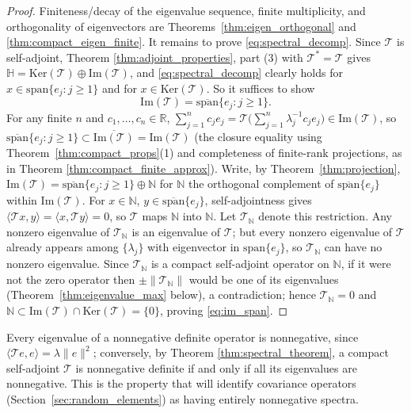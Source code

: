 \begin{proof}
Finiteness/decay of the eigenvalue sequence, finite multiplicity, and
orthogonality of eigenvectors are Theorems~\ref{thm:eigen_orthogonal} and
\ref{thm:compact_eigen_finite}. It remains to prove
\eqref{eq:spectral_decomp}. Since $\mathcal{T}$ is self-adjoint, Theorem
\ref{thm:adjoint_properties}, part (3) with $\mathcal{T}^*=\mathcal{T}$
gives $\mathbb{H} = \mathrm{Ker}(\mathcal{T})\oplus\mathrm{Im}(\mathcal{T})$,
and \eqref{eq:spectral_decomp} clearly holds for
$x\in\mathrm{span}\{e_j:j\geq 1\}$ and for $x\in\mathrm{Ker}(\mathcal{T})$.
So it suffices to show
\begin{equation}
\mathrm{Im}(\mathcal{T}) = \overline{\mathrm{span}}\{e_j:j\geq 1\}.
\label{eq:im_span}
\end{equation}
For any finite $n$ and $c_1,\dots,c_n\in\mathbb{R}$,
$\sum_{j=1}^n c_je_j = \mathcal{T}\big(\sum_{j=1}^n\lambda_j^{-1}c_je_j
\big)\in\mathrm{Im}(\mathcal{T})$, so $\overline{\mathrm{span}}\{e_j:j\geq
1\}\subset\overline{\mathrm{Im}(\mathcal{T})}=\mathrm{Im}(\mathcal{T})$
(the closure equality using Theorem~\ref{thm:compact_props}(1) and
completeness of finite-rank projections, as in Theorem
\ref{thm:compact_finite_approx}). Write, by Theorem~\ref{thm:projection},
$\mathrm{Im}(\mathcal{T}) = \overline{\mathrm{span}}\{e_j:j\geq
1\}\oplus\mathbb{N}$ for $\mathbb{N}$ the orthogonal complement of
$\overline{\mathrm{span}}\{e_j\}$ within $\mathrm{Im}(\mathcal{T})$. For
$x\in\mathbb{N}$, $y\in\overline{\mathrm{span}}\{e_j\}$, self-adjointness
gives $\langle\mathcal{T}x,y\rangle=\langle x,\mathcal{T}y\rangle=0$, so
$\mathcal{T}$ maps $\mathbb{N}$ into $\mathbb{N}$. Let $\mathcal{T}_
{\mathbb{N}}$ denote this restriction. Any nonzero eigenvalue of
$\mathcal{T}_\mathbb{N}$ is an eigenvalue of $\mathcal{T}$; but every
nonzero eigenvalue of $\mathcal{T}$ already appears among $\{\lambda_j\}$
with eigenvector in $\mathrm{span}\{e_j\}$, so $\mathcal{T}_\mathbb{N}$ can
have no nonzero eigenvalue. Since $\mathcal{T}_\mathbb{N}$ is a compact
self-adjoint operator on $\mathbb{N}$, if it were not the zero operator
then $\pm\|\mathcal{T}_\mathbb{N}\|$ would be one of its eigenvalues
(Theorem~\ref{thm:eigenvalue_max} below), a contradiction; hence
$\mathcal{T}_\mathbb{N}=0$ and $\mathbb{N}\subset\mathrm{Im}(\mathcal{T})
\cap\mathrm{Ker}(\mathcal{T}) = \{0\}$, proving \eqref{eq:im_span}.
\end{proof}

Every eigenvalue of a nonnegative definite operator is nonnegative, since
$\langle\mathcal{T}e,e\rangle=\lambda\|e\|^2$; conversely, by Theorem
\ref{thm:spectral_theorem}, a compact self-adjoint $\mathcal{T}$ is
nonnegative definite if and only if all its eigenvalues are nonnegative.
This is the property that will identify covariance operators
(Section~\ref{sec:random_elements}) as having entirely nonnegative spectra.

